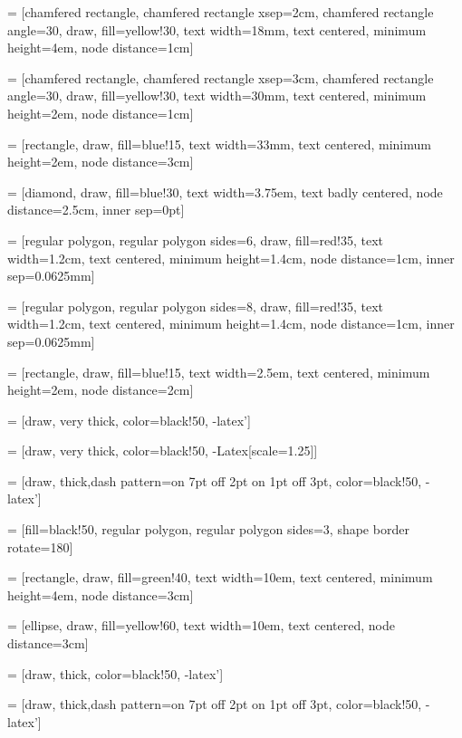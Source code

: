  = [chamfered rectangle, chamfered rectangle xsep=2cm, chamfered rectangle angle=30, draw, fill=yellow!30, text width=18mm, text centered, minimum height=4em, node distance=1cm]

 = [chamfered rectangle, chamfered rectangle xsep=3cm, chamfered rectangle angle=30, draw, fill=yellow!30, text width=30mm, text centered, minimum height=2em, node distance=1cm]


 = [rectangle, draw, fill=blue!15, text width=33mm, text centered, minimum height=2em, node distance=3cm]

 = [diamond, draw, fill=blue!30, text width=3.75em, text badly centered, node distance=2.5cm, inner sep=0pt]

 = [regular polygon, regular polygon sides=6, draw, fill=red!35, text width=1.2cm, text centered, minimum height=1.4cm, node distance=1cm, inner sep=0.0625mm]

 = [regular polygon, regular polygon sides=8, draw, fill=red!35, text width=1.2cm, text centered, minimum height=1.4cm, node distance=1cm, inner sep=0.0625mm]

 = [rectangle, draw, fill=blue!15, text width=2.5em, text centered, minimum height=2em, node distance=2cm]

 = [draw, very thick, color=black!50, -latex']

 = [draw, very thick, color=black!50, -{Latex[scale=1.25]}]

 = [draw, thick,dash pattern={on 7pt off 2pt on 1pt off 3pt}, color=black!50, -latex']

 = [fill=black!50, regular polygon, regular polygon sides=3, shape border rotate=180]

 = [rectangle, draw, fill=green!40, text width=10em, text centered, minimum height=4em, node distance=3cm]

 = [ellipse, draw, fill=yellow!60, text width=10em, text centered, node distance=3cm]

 = [draw, thick, color=black!50, -latex']

 = [draw, thick,dash pattern={on 7pt off 2pt on 1pt off 3pt}, color=black!50, -latex']
